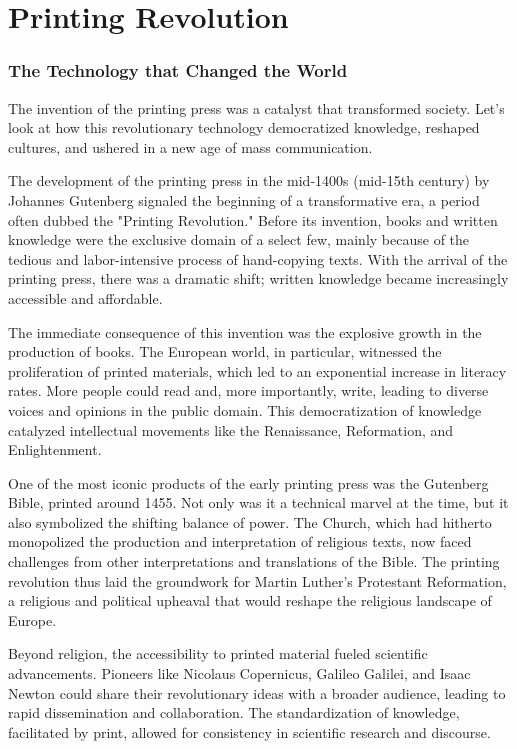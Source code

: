 \chapter{Printing Revolution}
\subsection*{The Technology that Changed the World}
The invention of the printing press was a catalyst that transformed society. Let's look at how this revolutionary technology democratized knowledge, reshaped cultures, and ushered in a new age of mass communication.

The development of the printing press in the mid-1400s (mid-15th century) by Johannes Gutenberg signaled the beginning of a transformative era, a period often dubbed the "Printing Revolution." Before its invention, books and written knowledge were the exclusive domain of a select few, mainly because of the tedious and labor-intensive process of hand-copying texts. With the arrival of the printing press, there was a dramatic shift; written knowledge became increasingly accessible and affordable.

The immediate consequence of this invention was the explosive growth in the production of books. The European world, in particular, witnessed the proliferation of printed materials, which led to an exponential increase in literacy rates. More people could read and, more importantly, write, leading to diverse voices and opinions in the public domain. This democratization of knowledge catalyzed intellectual movements like the Renaissance, Reformation, and Enlightenment.

One of the most iconic products of the early printing press was the Gutenberg Bible, printed around 1455. Not only was it a technical marvel at the time, but it also symbolized the shifting balance of power. The Church, which had hitherto monopolized the production and interpretation of religious texts, now faced challenges from other interpretations and translations of the Bible. The printing revolution thus laid the groundwork for Martin Luther's Protestant Reformation, a religious and political upheaval that would reshape the religious landscape of Europe.

Beyond religion, the accessibility to printed material fueled scientific advancements. Pioneers like Nicolaus Copernicus, Galileo Galilei, and Isaac Newton could share their revolutionary ideas with a broader audience, leading to rapid dissemination and collaboration. The standardization of knowledge, facilitated by print, allowed for consistency in scientific research and discourse.

